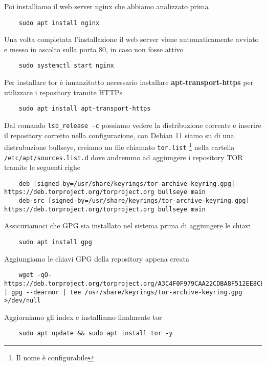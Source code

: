 Poi installiamo il web server nginx che abbiamo analizzato prima
\begin{lstlisting}
    sudo apt install nginx
\end{lstlisting}

Una volta completata l'installazione il web server viene automaticamente avviato e messo in ascolto sulla porta 80, in caso non fosse attivo \\
\begin{lstlisting}
    sudo systemctl start nginx
\end{lstlisting}

Per installare tor è innanzitutto necessario installare \textbf{apt-transport-https} per utilizzare i repository tramite HTTPs
\begin{lstlisting}
    sudo apt install apt-transport-https
\end{lstlisting}
Dal comando \lstinline{lsb_release -c} possiamo vedere la distribuzione corrente e inserire il repository corretto nella configurazione, con Debian 11 siamo su di una distrubuzione bullseye, creiamo un file chiamato \lstinline{tor.list} \footnote{Il nome è configurabile} nella cartella \lstinline{/etc/apt/sources.list.d} dove andremmo ad aggiungere i repository TOR tramite le seguenti righe
\begin{lstlisting}
    deb [signed-by=/usr/share/keyrings/tor-archive-keyring.gpg] https://deb.torproject.org/torproject.org bullseye main
    deb-src [signed-by=/usr/share/keyrings/tor-archive-keyring.gpg] https://deb.torproject.org/torproject.org bullseye main
\end{lstlisting}

Assicuriamoci che GPG sia installato nel sistema prima di aggiungere le chiavi
\begin{lstlisting}
    sudo apt install gpg
\end{lstlisting}

Aggiungiamo le chiavi GPG della repository appena creata
\begin{lstlisting}
    wget -qO- https://deb.torproject.org/torproject.org/A3C4F0F979CAA22CDBA8F512EE8CBC9E886DDD89.asc | gpg --dearmor | tee /usr/share/keyrings/tor-archive-keyring.gpg >/dev/null
\end{lstlisting}

Aggiorniamo gli index e installiamo finalmente tor
\begin{lstlisting}
    sudo apt update && sudo apt install tor -y 
\end{lstlisting}
\cite{TorRepo}

